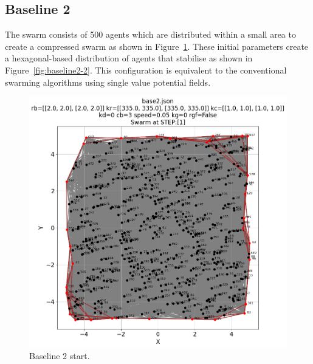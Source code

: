\documentclass[12pt,a4paper]{IEEEtran}
\begin{document}
\subsection{Baseline 2}
The swarm consists of 500 agents which are distributed within a small area to create a compressed swarm as shown in Figure~\ref{fig:baseline2}. These initial parameters create a hexagonal-based distribution of agents that stabilise as shown in Figure~\ref{fig:baseline2-2}. This configuration is equivalent to the conventional swarming algorithms using single value potential fields. 

\begin{figure}[H]
	\begin{center}
		\includegraphics[width=1.0\linewidth]{figures/baseline2-1}
	\end{center}
	\caption{Baseline 2 start. \label{fig:baseline2}}
\end{figure}
\end{document}

